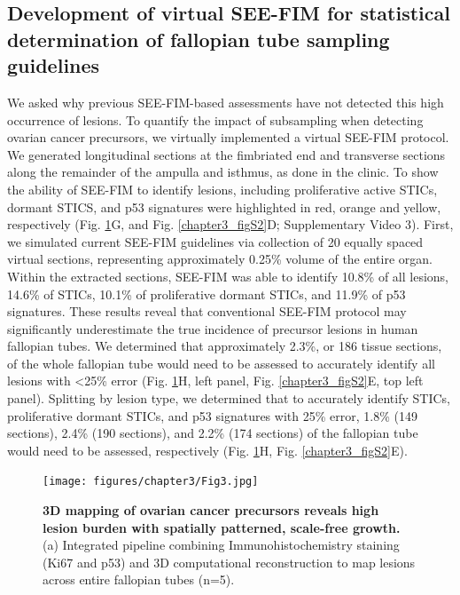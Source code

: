 \begin{refsection}
    \subsection{Development of virtual SEE-FIM for statistical determination of fallopian tube sampling guidelines}
    We asked why previous SEE-FIM-based assessments have not detected this high occurrence of lesions. To quantify the impact of subsampling when detecting ovarian cancer precursors, we virtually implemented a virtual SEE-FIM protocol. We generated longitudinal sections at the fimbriated end and transverse sections along the remainder of the ampulla and isthmus, as done in the clinic. To show the ability of SEE-FIM to identify lesions, including proliferative active STICs,  dormant STICS, and p53 signatures were highlighted in red, orange and yellow, respectively (Fig. \ref{chapter3_fig3}G, and Fig. \ref{chapter3_figS2}D; Supplementary Video 3).
    First, we simulated current SEE-FIM guidelines via collection of 20 equally spaced virtual sections, representing approximately 0.25\% volume of the entire organ. Within the extracted sections, SEE-FIM was able to identify 10.8\% of all lesions, 14.6\% of STICs, 10.1\% of proliferative dormant STICs, and 11.9\% of p53 signatures. These results reveal that conventional SEE-FIM protocol may significantly underestimate the true incidence of precursor lesions in human fallopian tubes. We determined that approximately 2.3\%, or 186 tissue sections, of the whole fallopian tube would need to be assessed to accurately identify all lesions with <25\% error (Fig. \ref{chapter3_fig3}H, left panel, Fig. \ref{chapter3_figS2}E, top left panel). Splitting by lesion type, we determined that to accurately identify STICs, proliferative dormant STICs, and p53 signatures with 25\% error, 1.8\% (149 sections), 2.4\% (190 sections), and 2.2\% (174 sections) of the fallopian tube would need to be assessed, respectively (Fig. \ref{chapter3_fig3}H, Fig. \ref{chapter3_figS2}E). 

    \begin{figure}[p]
        \begin{center}
            \texttt{[image: figures/chapter3/Fig3.jpg]}
            \captionsetup{font=small}
            \caption{ \textbf{3D mapping of ovarian cancer precursors reveals high lesion burden with spatially patterned, scale-free growth.} (a) Integrated pipeline combining Immunohistochemistry staining (Ki67 and p53) and 3D computational reconstruction to map lesions across entire fallopian tubes (n=5). }
            \label{chapter3_fig3}
        \end{center}
    \end{figure}
    

\end{refsection}
